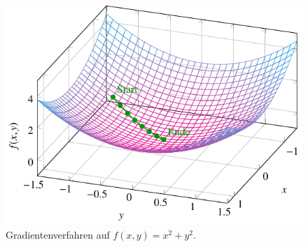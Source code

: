 \begin{figure}
	\centering
	\includegraphics{papers/antennen/images/gradienteverfahren.pdf}
	\caption{Gradientenverfahren auf $f(x,y)=x^2+y^2$.}
	\label{antennen:gradverfahrenBSP}
\end{figure}